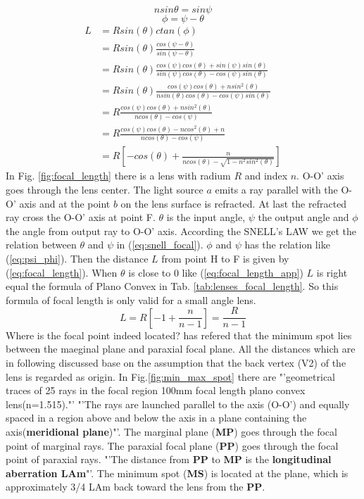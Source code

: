\begin{equation}
nsin\theta=sin\psi
\label{eq:snell_focal}
\end{equation}
\begin{equation}
\phi=\psi-\theta
\label{eq:psi_phi}
\end{equation}
\begin{align}
L&=Rsin(\theta) ctan(\phi) \nonumber\\
&=Rsin(\theta)\frac{cos(\psi-\theta)}{ sin(\psi-\theta)} \nonumber\\
&= Rsin(\theta)\frac{cos(\psi)cos(\theta)+sin(\psi)sin(\theta)}{sin(\psi)cos(\theta)-cos(\psi)sin(\theta)} \nonumber\\
&= Rsin(\theta)\frac{cos(\psi)cos(\theta)+nsin^{2}(\theta)}{nsin(\theta)cos(\theta)-cos(\psi)sin(\theta)} \nonumber\\
&=R\frac{cos(\psi)cos(\theta)+nsin^{2}(\theta)}{ncos(\theta)-cos(\psi)} \nonumber\\
&=R\frac{cos(\psi)cos(\theta)-ncos^{2}(\theta)+n}{ncos(\theta)-cos(\psi)} \nonumber\\
&=R \left[-cos(\theta)+\frac{n}{ncos(\theta)-\sqrt{1-n^{2}sin^{2}(\theta)}} \right]
\label{eq:focal_length}
\end{align}
In Fig. \ref{fig:focal_length} there is a lens with radium $R$ and index $n$. O-O' axis goes through the lens center.  The light source $a$ emits a ray parallel with the O-O' axis and at the point $b$ on the lens surface is refracted. At last the refracted ray cross the O-O' axis at point F. $\theta$ is the input angle, $\psi$ the output angle and $\phi$ the angle from output ray to O-O' axis. According the SNELL's LAW we get the relation between $\theta$ and $\psi$ in (\ref{eq:snell_focal}). $\phi$ and $\psi$ has the relation like (\ref{eq:psi_phi}). Then the distance $L$ from point H to F is given by (\ref{eq:focal_length}). When $\theta$ is close to 0 like (\ref{eq:focal_length_app}) $L$ is right equal the formula of Plano Convex in Tab. \ref{tab:lenses_focal_length}. So this formula of focal length is only valid for a small angle lens. 
\begin{equation}
L=R\left[ -1+\frac{n}{n-1}\right]=\frac{R}{n-1}
\label{eq:focal_length_app}
\end{equation}
Where is the focal point indeed located? \cite{lens_theory_LC_Ltd} has refered that the minimum spot lies between the maeginal plane and paraxial focal plane. All the distances which are in following discussed base on the assumption that the back vertex (V2) of the lens is regarded as origin. In Fig.\ref{fig:min_max_spot} there are "'geometrical traces of 25 rays in the focal region 100mm focal length plano convex lens(n=1.515)."'  "'The rays are launched parallel to the axis (O-O') and equally spaced in a region above and below the axis in a plane containing the axis(\textbf{meridional plane})"'. The marginal plane (\textbf{MP}) goes through the focal point of marginal rays. The paraxial focal plane (\textbf{PP}) goes through the focal point of paraxial rays. "'The distance from \textbf{PP} to \textbf{MP} is the \textbf{longitudinal aberration LAm}"'. The minimum spot (\textbf{MS}) is located at the plane, which is approximately 3/4 LAm back toward the lens from the \textbf{PP}.
